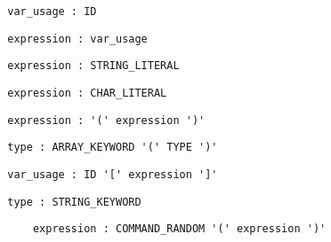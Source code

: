 \documentclass[10pt,landscape]{article}
\begin{document}
\begin{multicols}{3}
		\begin{verbatim}
		var_usage : ID
		\end{verbatim}
		\begin{verbatim}
		expression : var_usage
		\end{verbatim}
		\begin{verbatim}
		expression : STRING_LITERAL
		\end{verbatim}
		\begin{verbatim}
		expression : CHAR_LITERAL
		\end{verbatim}
		\begin{verbatim}
		expression : '(' expression ')'
		\end{verbatim}
		\begin{verbatim}
		type : ARRAY_KEYWORD '(' TYPE ')'
		\end{verbatim}
		\begin{verbatim}
		var_usage : ID '[' expression ']'
		\end{verbatim}
		\begin{verbatim}
		type : STRING_KEYWORD
		\end{verbatim}
		\begin{verbatim}
			expression : COMMAND_RANDOM '(' expression ')'
		\end{verbatim}
		

\end{multicols}
\end{document}
